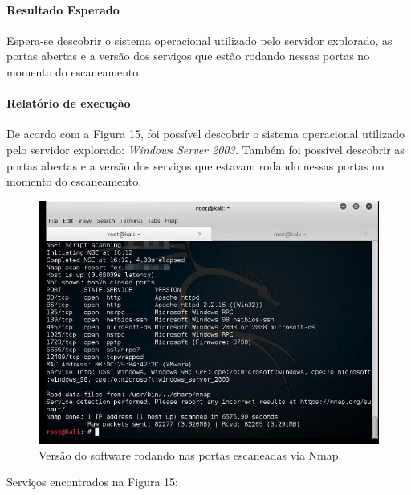 \documentclass[
    12pt,               %
    openright,          %
    oneside,            %
    a4paper,            %
    section=TITLE,     %
    english,            %
    french,             %
    spanish,            %
    brazil              %
    ]{abntex2}
\begin{document}
\paragraph*{Resultado Esperado}

Espera-se descobrir o sistema operacional utilizado pelo servidor explorado, as portas abertas e a versão dos serviços que estão rodando nessas portas no momento do escaneamento.



\paragraph*{Relatório de execução}




De acordo com a Figura 15, foi possível descobrir o sistema operacional utilizado pelo servidor explorado: \emph{Windows Server 2003.} Também foi possível descobrir as portas abertas e a versão dos serviços que estavam rodando nessas portas no momento do escaneamento.





\begin{figure}[htp]
\centering
\caption{Versão do software rodando nas portas escaneadas via Nmap.}
\includegraphics[width=450px]{image9.jpeg}
\end{figure}
\ifdefined\FloatBarrier \FloatBarrier \fi


Serviços encontrados na Figura 15:
\end{document}
